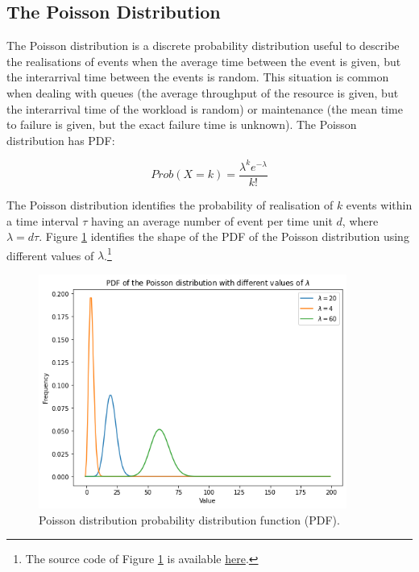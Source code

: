 \subsection{The Poisson Distribution} \label{secPoisson}
The Poisson distribution is a discrete probability distribution useful to describe the realisations of events when the average time between the event is given, but the interarrival time between the events is random. This situation is common when dealing with queues (the average throughput of the resource is given, but the interarrival time of the workload is random) or maintenance (the mean time to failure is given, but the exact failure time is unknown). The Poisson distribution has PDF:

\begin{equation}
Prob\left(X=k\right)=\frac{\lambda^ke^{-\lambda}}{k!}
\label{eq_poissonPDF}
\end{equation}

The Poisson distribution identifies the probability of realisation of $k$ events within a time interval $\tau$ having an average number of event per time unit $d$, where $\lambda=d\tau$. Figure \ref{fig_poisson} identifies the shape of the PDF of the Poisson distribution using different values of $\lambda$.\footnote{The source code of Figure \ref{fig_poisson} is available \href{https://github.com/aletuf93/logproj/blob/master/examples/03.\%20Statistics.ipynb}{here}.
}


\begin{figure}[hbt!]
\centering
\includegraphics[width=0.9\textwidth]{SectionLetsMath/elemStat_figures/fig_poisson.png}
\captionsetup{type=figure}
\caption{Poisson distribution probability distribution function (PDF).}
\label{fig_poisson}
\end{figure}

